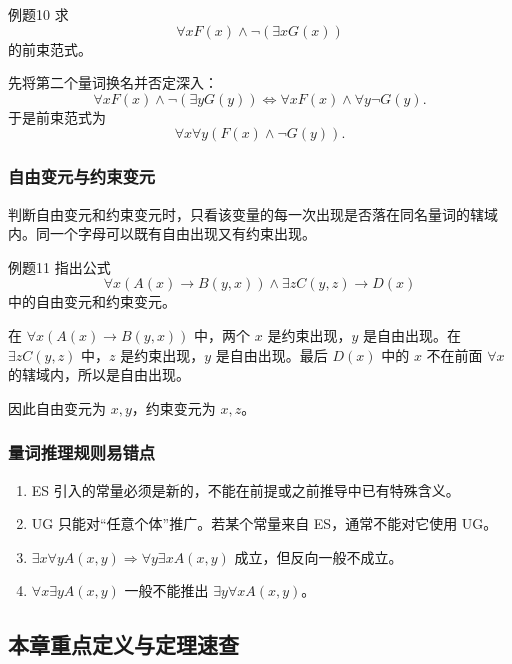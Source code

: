 \begin{question}{例题10}
	求
	\[
	\forall xF(x)\land\neg(\exists xG(x))
	\]
	的前束范式。
	
	\begin{solution}
	先将第二个量词换名并否定深入：
	\[
	\forall xF(x)\land\neg(\exists yG(y))
	\Leftrightarrow
	\forall xF(x)\land\forall y\neg G(y).
	\]
	于是前束范式为
	\[
	\forall x\forall y(F(x)\land\neg G(y)).
	\]
	\end{solution}
\end{question}

\subsubsection{自由变元与约束变元}

判断自由变元和约束变元时，只看该变量的每一次出现是否落在同名量词的辖域内。同一个字母可以既有自由出现又有约束出现。

\begin{question}{例题11}
	指出公式
	\[
	\forall x(A(x)\to B(y,x))\land\exists zC(y,z)\to D(x)
	\]
	中的自由变元和约束变元。
	
	\begin{solution}
	在 \(\forall x(A(x)\to B(y,x))\) 中，两个 \(x\) 是约束出现，\(y\) 是自由出现。在 \(\exists zC(y,z)\) 中，\(z\) 是约束出现，\(y\) 是自由出现。最后 \(D(x)\) 中的 \(x\) 不在前面 \(\forall x\) 的辖域内，所以是自由出现。
	
	因此自由变元为 \(x,y\)，约束变元为 \(x,z\)。
	\end{solution}
\end{question}

\subsubsection{量词推理规则易错点}

\begin{enumerate}
	\item ES 引入的常量必须是新的，不能在前提或之前推导中已有特殊含义。
	\item UG 只能对“任意个体”推广。若某个常量来自 ES，通常不能对它使用 UG。
	\item \(\exists x\forall yA(x,y)\Rightarrow\forall y\exists xA(x,y)\) 成立，但反向一般不成立。
	\item \(\forall x\exists yA(x,y)\) 一般不能推出 \(\exists y\forall xA(x,y)\)。
\end{enumerate}

\subsection{本章重点定义与定理速查}

